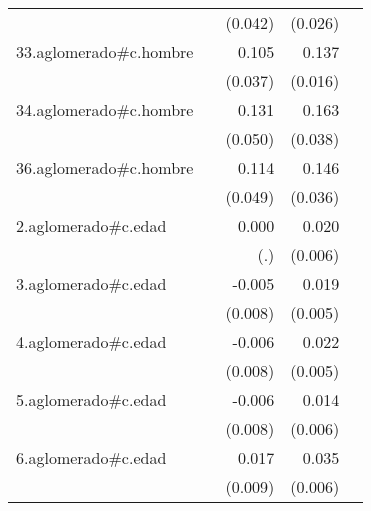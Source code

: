 {\begin{longtable}{l*{4}{D{.}{.}{-1}}}
            &                     &     (0.042)         &     (0.026)         &                     \\
\addlinespace
33.aglomerado#c.hombre&                     &       0.105\sym{**} &       0.137\sym{***}&                     \\
            &                     &     (0.037)         &     (0.016)         &                     \\
\addlinespace
34.aglomerado#c.hombre&                     &       0.131\sym{**} &       0.163\sym{***}&                     \\
            &                     &     (0.050)         &     (0.038)         &                     \\
\addlinespace
36.aglomerado#c.hombre&                     &       0.114\sym{*}  &       0.146\sym{***}&                     \\
            &                     &     (0.049)         &     (0.036)         &                     \\
\addlinespace
2.aglomerado#c.edad&                     &       0.000         &       0.020\sym{***}&                     \\
            &                     &         (.)         &     (0.006)         &                     \\
\addlinespace
3.aglomerado#c.edad&                     &      -0.005         &       0.019\sym{***}&                     \\
            &                     &     (0.008)         &     (0.005)         &                     \\
\addlinespace
4.aglomerado#c.edad&                     &      -0.006         &       0.022\sym{***}&                     \\
            &                     &     (0.008)         &     (0.005)         &                     \\
\addlinespace
5.aglomerado#c.edad&                     &      -0.006         &       0.014\sym{*}  &                     \\
            &                     &     (0.008)         &     (0.006)         &                     \\
\addlinespace
6.aglomerado#c.edad&                     &       0.017         &       0.035\sym{***}&                     \\
            &                     &     (0.009)         &     (0.006)         &                     \\

\end{longtable}}
